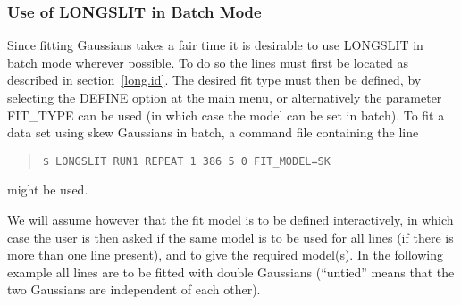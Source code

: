 \subsubsection{Use of LONGSLIT in Batch Mode}

Since fitting Gaussians takes a fair time it is desirable to use
LONGSLIT in batch mode wherever possible.
To do so the lines must first be located as described in
section~\ref{long.id}.
The desired fit type must then be defined, by selecting the DEFINE
option at the main menu, or alternatively the parameter FIT\_TYPE can be
used (in which case the model can be set in batch).
To fit a data set using skew Gaussians in batch, a command file
containing the line
\begin{quote}\begin{verbatim}
$ LONGSLIT RUN1 REPEAT 1 386 5 0 FIT_MODEL=SK
\end{verbatim}\end{quote}
might be used.

We will assume however that the fit model is to be defined
interactively, in which case the user is then asked if the same
model is to be used for all lines (if there is more than one line
present), and to give the required model(s).
In the following example all lines are to be fitted with double
Gaussians (``untied'' means that the two Gaussians are independent of
each other).

